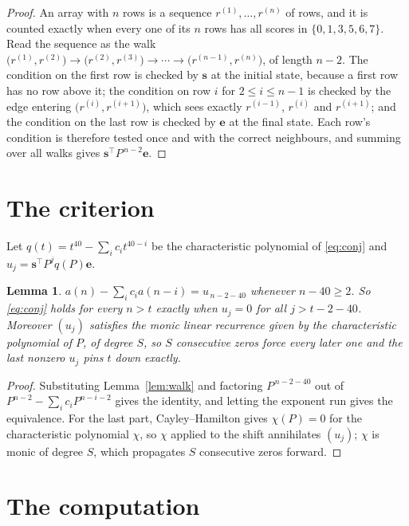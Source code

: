 \documentclass[11pt,a4paper]{article}
\theoremstyle{plain}
\newtheorem{lemma}[theorem]{Lemma}
\theoremstyle{definition}
\begin{document}
\begin{proof}
An array with $n$ rows is a sequence $r^{(1)},\dots,r^{(n)}$ of rows, and it is counted
exactly when every one of its $n$ rows has all scores in $\{0,1,3,5,6,7\}$. Read the sequence as the
walk $\bigl(r^{(1)},r^{(2)}\bigr)\to\bigl(r^{(2)},r^{(3)}\bigr)\to\cdots\to
\bigl(r^{(n-1)},r^{(n)}\bigr)$, of length $n-2$. The condition on the first row is
checked by $\mathbf{s}$ at the initial state, because a first row has no row above it; the
condition on row $i$ for $2\le i\le n-1$ is checked by the edge entering
$\bigl(r^{(i)},r^{(i+1)}\bigr)$, which sees exactly $r^{(i-1)}$, $r^{(i)}$ and
$r^{(i+1)}$; and the condition on the last row is checked by $\mathbf{e}$ at the final
state. Each row's condition is therefore tested once and with the correct neighbours, and
summing over all walks gives $\mathbf{s}^{\!\top}P^{\,n-2}\mathbf{e}$.
\end{proof}

\section{The criterion}

Let $q(t)=t^{40}-\sum_i c_i t^{40-i}$ be the characteristic polynomial of
\eqref{eq:conj} and $u_j=\mathbf{s}^{\!\top}P^{j}q(P)\mathbf{e}$.

\begin{lemma}\label{lem:crit}
$a(n)-\sum_i c_i a(n-i)=u_{\,n-2-40}$ whenever $n-40\ge2$. So \eqref{eq:conj}
holds for every $n>t$ exactly when $u_j=0$ for all $j>t-2-40$. Moreover $(u_j)$
satisfies the monic linear recurrence given by the characteristic polynomial of $P$, of
degree $S$, so $S$ consecutive zeros force every later one and the last nonzero $u_j$ pins
$t$ down exactly.
\end{lemma}

\begin{proof}
Substituting Lemma~\ref{lem:walk} and factoring $P^{\,n-2-40}$ out of
$P^{n-2}-\sum_i c_i P^{n-i-2}$ gives the identity, and letting the exponent run gives the
equivalence. For the last part, Cayley--Hamilton gives $\chi(P)=0$ for the characteristic
polynomial $\chi$, so $\chi$ applied to the shift annihilates $(u_j)$; $\chi$ is monic of
degree $S$, which propagates $S$ consecutive zeros forward.
\end{proof}

\section{The computation}
\end{document}
